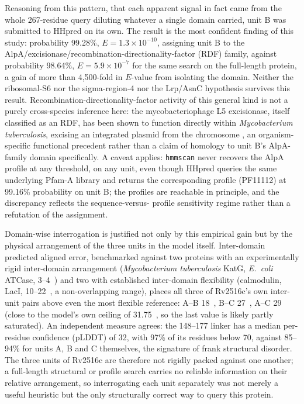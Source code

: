 \documentclass[11pt,a4paper]{article}
\newcommand{\mtb}{\textit{Mycobacterium tuberculosis}}
\newcommand{\ang}{\text{\AA}}
\begin{document}
Reasoning from this pattern, that each apparent signal in fact came from the whole 267-residue
query diluting whatever a single domain carried, unit B was submitted to HHpred on its own. The
result is the most confident finding of this study: probability 99.28\%, $E=1.3\times10^{-10}$,
assigning unit B to the AlpA/excisionase/recombination-directionality-factor (RDF) family, against
probability 98.64\%, $E=5.9\times10^{-7}$ for the same search on the full-length protein, a gain of
more than 4{,}500-fold in $E$-value from isolating the domain. Neither the ribosomal-S6 nor the
sigma-region-4 nor the Lrp/AsnC hypothesis survives this result. Recombination-directionality-factor
activity of this general kind is not a purely cross-species inference here: the mycobacteriophage L5
excisionase, itself classified as an RDF, has been shown to function directly within \mtb{}, excising
an integrated plasmid from the chromosome \citep{parish2001excisionase}, an organism-specific
functional precedent rather than a claim of homology to unit B's AlpA-family domain specifically. A
caveat applies: \texttt{hmmscan}
never recovers the AlpA profile at any threshold, on any unit, even though HHpred queries the same
underlying Pfam-A library and returns the corresponding profile (PF11112) at 99.16\% probability on
unit B; the profiles are reachable in principle, and the discrepancy reflects the sequence-versus-
profile sensitivity regime rather than a refutation of the assignment.

Domain-wise interrogation is justified not only by this empirical gain but by the physical
arrangement of the three units in the model itself. Inter-domain predicted aligned error, benchmarked
against two proteins with an experimentally rigid inter-domain arrangement (\mtb{} KatG,
\textit{E.\ coli} ATCase, 3--4~\ang{}) and two with established inter-domain flexibility
(calmodulin, LacI, 10--22~\ang{}, a non-overlapping range), places all three of Rv2516c's own
inter-unit pairs above even the most flexible reference: A--B 18~\ang{}, B--C 27~\ang{}, A--C
29~\ang{} (close to the model's own ceiling of 31.75~\ang{}, so the last value is likely partly
saturated). An independent measure agrees: the 148--177 linker has a median per-residue confidence
(pLDDT) of 32, with 97\% of its residues below 70, against 85--94\% for units A, B and C
themselves, the signature of frank structural disorder. The three units of Rv2516c are therefore
not rigidly packed against one another; a full-length structural or profile search carries no
reliable information on their relative arrangement, so interrogating each unit separately was not
merely a useful heuristic but the only structurally correct way to query this protein.
\end{document}
